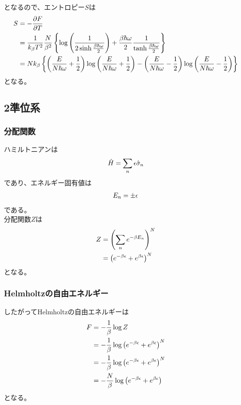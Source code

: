 \documentclass{jsarticle}  %
\numberwithin{equation}{section} %
\numberwithin{figure}{section}
\begin{document}
    となるので、エントロピー$S$は
    \begin{align}
        S &= -\frac{\partial F}{\partial T} \notag \\
        &= \frac{1}{k_\beta T^2} \frac{N}{\beta^2} \left\{ \log \left( \frac{1}{2\sinh \frac{\beta \hbar \omega}{2}} \right) + \frac{\beta \hbar \omega}{2} \frac{1}{\tanh \frac{\beta \hbar \omega}{2}} \right\} \\ 
        &= Nk_\beta \left\{ \left( \frac{E}{N\hbar \omega} + \frac{1}{2} \right) \log \left( \frac{E}{N\hbar \omega} + \frac{1}{2} \right) - \left(\frac{E}{N\hbar \omega } -\frac{1}{2} \right)  \log \left( \frac{E}{N\hbar \omega} - \frac{1}{2}  \right) \right\}
    \end{align}
    となる。
\subsection{2準位系}
\subsubsection{分配関数}
    ハミルトニアンは
    \begin{align}
        \hat{H} = \sum_n \epsilon \hat{\sigma}_n \notag 
    \end{align}
    であり、エネルギー固有値は
    \begin{align}
        E_n = \pm \epsilon \notag 
    \end{align}
    である。\\
    分配関数$Z$は
    \begin{align}
        Z &= \left( \sum_n e^{-\beta E_n} \right)^N \notag \\
        &= \left( e^{-\beta \epsilon} + e^{\beta \epsilon} \right)^N \notag 
    \end{align}
    となる。
\subsubsection{Helmholtzの自由エネルギー}
    したがってHelmholtzの自由エネルギーは
    \begin{align}
        F &= - \frac{1}{\beta} \log Z \notag \\
        &= -\frac{1}{\beta} \log \left( e^{-\beta \epsilon} + e^{\beta \epsilon} \right)^N \notag \\
        &= -\frac{1}{\beta} \log \left( e^{-\beta \epsilon} + e^{\beta \epsilon} \right)^N \notag \\
        &= -\frac{N}{\beta} \log \left( e^{-\beta \epsilon} + e^{\beta \epsilon} \right) 
    \end{align}
    となる。
\end{document}
